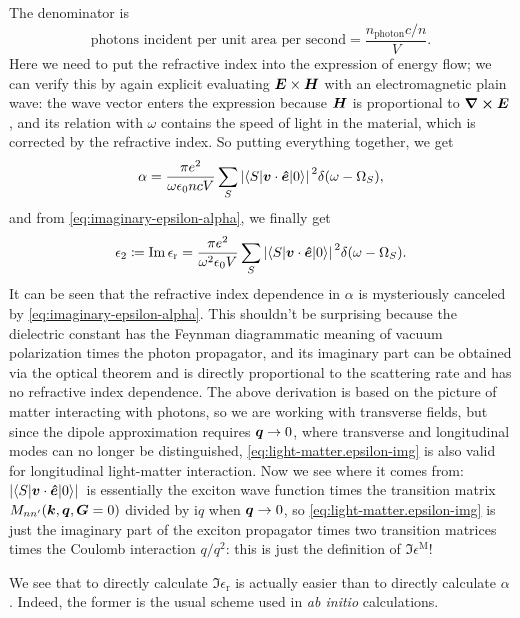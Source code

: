 \documentclass[hyperref, a4paper, 12pt]{report}
\newcommand*{\ii}{\mathrm{i}}
\newcommand*{\abinitio}{\textit{ab initio}}
\newcommand*{\epsr}{\epsilon_{\text{r}}}
\begin{document}
The denominator is 
\[
    \text{photons incident per unit area per second} = \frac{n_{\text{photon}} c / n}{V}.
\]
Here we need to put the refractive index into 
the expression of energy flow;
we can verify this by again explicit evaluating $\vb*{E} \times \vb*{H}$
with an electromagnetic plain wave: 
the wave vector enters the expression 
because $\vb*{H}$ is proportional to $\curl{\vb*{E}}$,
and its relation with $\omega$ contains 
the speed of light in the material,
which is corrected by the refractive index.
So putting everything together, we get 
\begin{equation}
    \alpha = \frac{\pi e^2}{\omega \epsilon_0 n c V} \sum_S \abs*{\mel**{S}{\vb*{v} \cdot \vu*{e}}{0}}^2 \delta(\omega - \Omega_S),
\end{equation}
and from \eqref{eq:imaginary-epsilon-alpha}, we finally get
\begin{equation}
    \epsilon_2 \coloneqq \Im \epsr = \frac{\pi e^2}{\omega^2 \epsilon_0 V} 
        \sum_S \abs*{\mel**{S}{\vb*{v} \cdot \vu*{e}}{0}}^2 \delta(\omega - \Omega_S).
    \label{eq:light-matter.epsilon-img}
\end{equation}
It can be seen that the refractive index dependence in $\alpha$ 
is mysteriously canceled by \eqref{eq:imaginary-epsilon-alpha}.
This shouldn't be surprising 
because the dielectric constant has the Feynman diagrammatic meaning of 
vacuum polarization times the photon propagator,
and its imaginary part can be obtained via the optical theorem
and is directly proportional to the scattering rate 
and has no refractive index dependence.
The above derivation is based on the picture of matter interacting with photons,
so we are working with transverse fields,
but since the dipole approximation requires $\vb*{q} \to 0$,
where transverse and longitudinal modes can no longer be distinguished,
\eqref{eq:light-matter.epsilon-img} is also valid for longitudinal light-matter interaction.
Now we see where it comes from:
$\abs*{\mel**{S}{\vb*{v} \cdot \vu*{e}}{0}}$ is essentially 
the exciton wave function times the transition matrix $M_{nn'}(\vb*{k}, \vb*{q}, \vb*{G}=0)$ 
divided by $\ii q$ when $\vb*{q} \to 0$,
so \eqref{eq:light-matter.epsilon-img} is just the imaginary part of the exciton propagator 
times two transition matrices times the Coulomb interaction $q/q^2$:
this is just the definition of $\Im \epsilon^{\text{M}}$!

We see that to directly calculate $\Im \epsilon_{\text{r}}$ is actually easier 
than to directly calculate $\alpha$.
Indeed, the former is the usual scheme used in \abinitio{} calculations.
\end{document}
